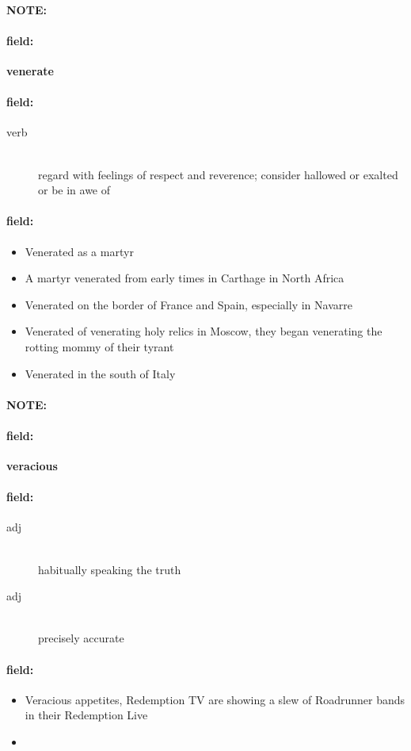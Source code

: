 \documentclass[12pt]{article}
\newenvironment{note}{\paragraph{NOTE:}}{}
\newenvironment{field}{\paragraph{field:}}{}
\begin{document}
\begin{note}
\begin{field}
\textbf{\large venerate}
\end{field}


\begin{field}
\begin{description}
\item[verb] \hfill \\ 
regard with feelings of respect and reverence; consider hallowed or exalted or be in awe of

\end{description}
\end{field}

\begin{field}
\begin{itemize}
\item Venerated as a martyr
\item A martyr venerated from early times in Carthage in North Africa
\item Venerated on the border of France and Spain, especially in Navarre
\item Venerated of venerating holy relics in Moscow, they began venerating the rotting mommy of their tyrant
\item Venerated in the south of Italy
\end{itemize}
\end{field}
\end{note}
\begin{note}
\begin{field}
\textbf{\large veracious}
\end{field}


\begin{field}
\begin{description}
\item[adj] \hfill \\ 
habitually speaking the truth

\item[adj] \hfill \\ 
precisely accurate

\end{description}
\end{field}

\begin{field}
\begin{itemize}
\item Veracious appetites, Redemption TV are showing a slew of Roadrunner bands in their Redemption Live
\item 
\end{itemize}
\end{field}
\end{note}
\end{document}
